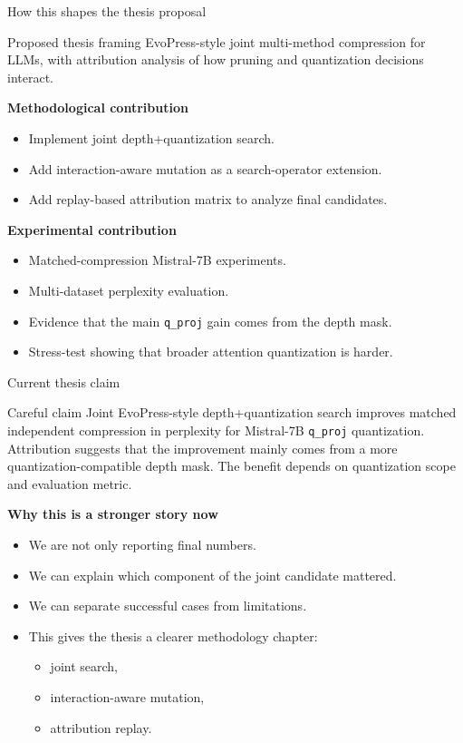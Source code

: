 \documentclass[aspectratio=169]{beamer}
\begin{document}
\begin{frame}{How this shapes the thesis proposal}
\begin{block}{Proposed thesis framing}
EvoPress-style joint multi-method compression for LLMs, with attribution analysis of how pruning and quantization decisions interact.
\end{block}

\vspace{0.25cm}
\textbf{Methodological contribution}
\begin{itemize}
    \item Implement joint depth+quantization search.
    \item Add interaction-aware mutation as a search-operator extension.
    \item Add replay-based attribution matrix to analyze final candidates.
\end{itemize}

\vspace{0.2cm}
\textbf{Experimental contribution}
\begin{itemize}
    \item Matched-compression Mistral-7B experiments.
    \item Multi-dataset perplexity evaluation.
    \item Evidence that the main \texttt{q\_proj} gain comes from the depth mask.
    \item Stress-test showing that broader attention quantization is harder.
\end{itemize}
\end{frame}


\begin{frame}{Current thesis claim}
\begin{block}{Careful claim}
Joint EvoPress-style depth+quantization search improves matched independent compression in perplexity for Mistral-7B \texttt{q\_proj} quantization. Attribution suggests that the improvement mainly comes from a more quantization-compatible depth mask. The benefit depends on quantization scope and evaluation metric.
\end{block}

\vspace{0.25cm}
\textbf{Why this is a stronger story now}
\begin{itemize}
    \item We are not only reporting final numbers.
    \item We can explain which component of the joint candidate mattered.
    \item We can separate successful cases from limitations.
    \item This gives the thesis a clearer methodology chapter:
    \begin{itemize}
        \item joint search,
        \item interaction-aware mutation,
        \item attribution replay.
    \end{itemize}
\end{itemize}
\end{frame}
\end{document}
